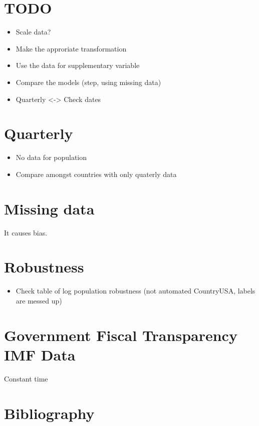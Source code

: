 \documentclass[a4paper]{article}
\begin{document}
\section{{\bfseries\sffamily TODO} }
\label{sec-3}

\begin{itemize}
\item Scale data?
\item Make the approriate transformation
\item Use the data for supplementary variable

\item Compare the models (step, using missing data)
\item Quarterly <-> Check dates
\end{itemize}

\section{Quarterly}
\label{sec-4}

\begin{itemize}
\item No data for population
\item Compare amongst countries with only quaterly data
\end{itemize}

\section{Missing data}
\label{sec-5}

It causes bias.

\section{Robustness}
\label{sec-6}

\begin{itemize}
\item Check table of log population robustness (not automated CountryUSA,
labels are messed up)
\end{itemize}

\section{Government Fiscal Transparency IMF Data}
\label{sec-7}

Constant time

\section{Bibliography}
\label{sec-8}
\end{document}
